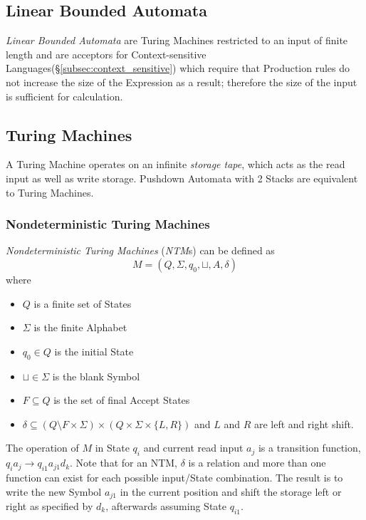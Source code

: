 \documentclass{article}
\begin{document}
\subsection{Linear Bounded Automata} \label{subsec:linear_bounded_automata}
\emph{Linear Bounded Automata} are Turing Machines restricted to an
input of finite length and are acceptors for Context-sensitive
Languages(\S\ref{subsec:context_sensitive}) which require that
Production rules do not increase the size of the Expression as a
result; therefore the size of the input is sufficient for calculation.

\subsection{Turing Machines}\label{subsec:turing_machine}
A Turing Machine operates on an infinite \emph{storage tape}, which
acts as the read input as well as write storage. Pushdown Automata
with 2 Stacks are equivalent to Turing Machines.

\subsubsection{Nondeterministic Turing Machines}
\emph{Nondeterministic Turing Machines} (\emph{NTM}s) can be defined
as
    \[
        M = (Q, \Sigma, q_0, \sqcup, A, \delta)
    \]
where
\begin{itemize}
\item $Q$ is a finite set of States
\item $\Sigma$ is the finite Alphabet
\item $q_0 \in Q$ is the initial State
\item $\sqcup \in \Sigma$ is the blank Symbol
\item $F \subseteq Q$ is the set of final Accept States
\item $\delta \subseteq (Q \setminus F \times \Sigma) \times (Q \times
  \Sigma \times \{L,R\})$ and $L$ and $R$ are left and right shift.
\end{itemize}

The operation of $M$ in State $q_i$ and current read input $a_j$ is a
transition function, $q_i a_j \rightarrow q_{i1} a_{j1} d_k$. Note
that for an NTM, $\delta$ is a relation and more than one function can
exist for each possible input/State combination. The result is to
write the new Symbol $a_{j1}$ in the current position and shift the
storage left or right as specified by $d_k$, afterwards assuming State
$q_{i1}$.
\end{document}
